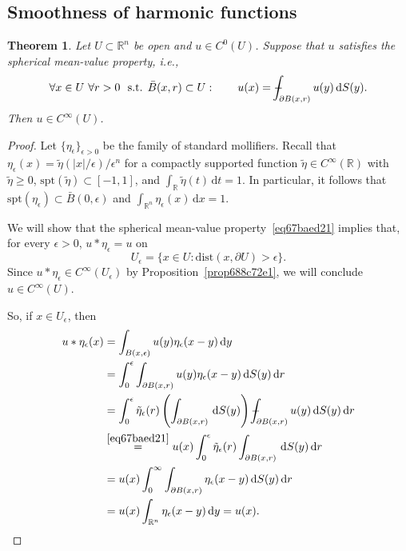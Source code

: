 \documentclass[a4paper,9pt]{amsart}
\newcommand{\R}{\mathbb{R}}	%
\newcommand{\did}{\,\mathrm{d}}	%
\newcommand{\de}{\partial}		%
\newcommand{\dist}{\mathrm{dist}}
\newcommand{\spt}{\mathrm{spt}}
\def\Xint#1{\mathchoice
      {\XXint\displaystyle\textstyle{#1}}%
      {\XXint\textstyle\scriptstyle{#1}}%
      {\XXint\scriptstyle\scriptscriptstyle{#1}}%
      {\XXint\scriptscriptstyle\scriptscriptstyle{#1}}%
      \!\int}
\def\XXint#1#2#3{{\setbox0=\hbox{$#1{#2#3}{\int}$}
        \vcenter{\hbox{$#2#3$}}\kern-.5\wd0}}
\def\fint{\Xint-}
\theoremstyle{plain}
\newtheorem{theorem}[proposition]{Theorem}
\theoremstyle{definition}
\theoremstyle{remark}
\begin{document}
\subsection{Smoothness of harmonic functions}\label{subs67baec70}

\begin{theorem}\label{thm67baed2c}
	Let $U\subset \R^n$ be open and $u\in C^0(U)$.
	Suppose that $u$ satisfies the spherical mean-value property, i.e.,
	\begin{equation}\label{eq67baed21}
		\forall x\in U\ \forall r>0\ \text{ s.t. } \bar B(x,r)\subset U :
		\qquad u(x) = \fint_{\de B(x,r)} u(y) \did S(y) .
	\end{equation}
	Then $u\in C^\infty(U)$.
\end{theorem}
\begin{proof}
	Let $\{\eta_\epsilon\}_{\epsilon>0}$ be the family of standard mollifiers.
	Recall that $\eta_\epsilon(x) = \tilde\eta(|x|/\epsilon)/\epsilon^n$ for a compactly supported function $\tilde\eta\in C^\infty(\R)$ with $\tilde\eta\ge0$, $\spt(\tilde\eta)\subset[-1,1]$, and $\int_\R\tilde\eta(t)\did t = 1$.
	In particular, it follows that $\spt(\eta_\epsilon)\subset \bar B(0,\epsilon)$ 
	and $\int_{\R^n}\eta_\epsilon(x)\did x = 1$.

	We will show that the spherical mean-value property~\eqref{eq67baed21} implies that, for every $\epsilon>0$, $u*\eta_\epsilon = u$ on 
	\[
	U_\epsilon = \{x\in U : \dist(x,\de U) > \epsilon\} .
	\]
	Since $u*\eta_\epsilon \in C^\infty(U_\epsilon)$ by Proposition~\ref{prop688c72e1}, we will conclude $u\in C^\infty(U)$.
	
	So, if $x\in U_\epsilon$, then
	\begin{align*}
		u*\eta_\epsilon(x)
		&= \int_{B(x,\epsilon)} u(y) \eta_\epsilon(x-y) \did y \\
		&= \int_0^\epsilon \int_{\de B(x,r)} u(y)\eta_\epsilon(x-y) \did S(y) \did r\\
		&= \int_0^\epsilon \tilde\eta_\epsilon(r) \left(\int_{\de B(x,r)}  \did S(y)\right) \fint_{\de B(x,r)} u(y) \did S(y) \did r\\
		&\overset{\eqref{eq67baed21}}= u(x) \int_0^\epsilon \tilde\eta_\epsilon(r) \int_{\de B(x,r)} \did S(y) \did r\\
		&= u(x) \int_0^\infty  \int_{\de B(x,r)} \eta_\epsilon(x-y) \did S(y) \did r\\
		&= u(x) \int_{\R^n} \eta_\epsilon(x-y) \did y 
		= u(x) .
	\end{align*}
\end{proof}
\end{document}
